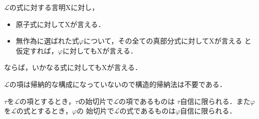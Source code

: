 	\begin{screen}
		\begin{metaaxm}
			$\mathcal{L}$の式に対する言明Xに対し，
			\begin{itemize}
				\item 原子式に対してXが言える．
				\item 無作為に選ばれた式$\varphi$について，その全ての真部分式に対してXが言える
					と仮定すれば，$\varphi$に対してもXが言える．
			\end{itemize}
			ならば，いかなる式に対してもXが言える．
		\end{metaaxm}
	\end{screen}
	
	$\mathcal{L}$の項は帰納的な構成になっていないので構造的帰納法は不要である．
	
	\begin{screen}
		\begin{metathm}
		\label{metathm:initial_segment_L}
			$\tau$を$\mathcal{L}$の項とするとき，$\tau$の始切片で$\mathcal{L}$の項であるものは
			$\tau$自信に限られる．また$\varphi$を$\mathcal{L}$の式とするとき，$\varphi$の
			始切片で$\mathcal{L}$の式であるものは$\varphi$自信に限られる．
		\end{metathm}
	\end{screen}
	
